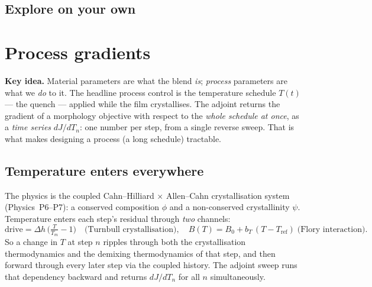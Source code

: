 \section{Explore on your own}



\chapter{Process gradients}
\label{ch:d4}

\begin{keybox}
\textbf{Key idea.} Material parameters are what the blend \emph{is};
\emph{process} parameters are what we \emph{do} to it. The headline
process control is the temperature schedule $T(t)$ --- the quench ---
applied while the film crystallises. The adjoint returns the gradient of
a morphology objective with respect to the \emph{whole schedule at once},
as a \emph{time series} $dJ/dT_n$: one number per step, from a single
reverse sweep. That is what makes designing a process (a long schedule)
tractable.
\end{keybox}

\section{Temperature enters everywhere}

The physics is the coupled Cahn--Hilliard $\times$ Allen--Cahn
crystallisation system (Physics~P6--P7): a conserved composition $\phi$
and a non-conserved crystallinity $\psi$. Temperature enters each step's
residual through \emph{two} channels:
%
\begin{equation}
  \text{drive} = \Delta h\,\Big(\tfrac{T}{T_m}-1\Big)
  \quad\text{(Turnbull crystallisation)},
  \quad
  B(T) = B_0 + b_T\,(T-T_{\text{ref}})
  \;\text{(Flory interaction)} .
\end{equation}
%
So a change in $T$ at step $n$ ripples through both the crystallisation
thermodynamics and the demixing thermodynamics of that step, and then
forward through every later step via the coupled history. The adjoint
sweep runs that dependency backward and returns $dJ/dT_n$ for all $n$
simultaneously.

